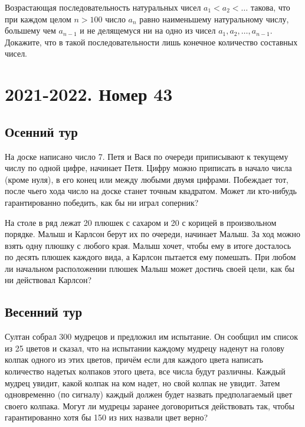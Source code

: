 \documentclass[11pt, a4paper]{common/document_template}
\begin{document}
\begin{exercise}
Возрастающая последовательность натуральных чисел $a_{1} < a_{2} < \dots$ такова, что при каждом целом $n > 100$ число $a_{n}$ равно
наименьшему натуральному числу, большему чем $a_{n-1}$ и не делящемуся ни на одно из чисел $a_{1}, a_{2}, \dots, a_{n-1}$. Докажите, что в такой последовательности лишь конечное количество составных чисел.
\end{exercise}

\chapter{2021-2022. Номер 43}

\section{Осенний тур}

\begin{exercise}
На доске написано число 7. Петя и Вася по очереди приписывают к текущему числу по одной цифре, начинает Петя. Цифру можно приписать в начало числа (кроме нуля), в его конец или между любыми двумя цифрами. Побеждает тот, после чьего хода число на доске станет точным квадратом. Может ли кто-нибудь гарантированно победить, как бы ни играл соперник?
\end{exercise}

\begin{exercise}
На столе в ряд лежат 20 плюшек с сахаром и 20 с корицей в произвольном порядке. Малыш и Карлсон берут их по очереди, начинает Малыш. За ход можно взять одну плюшку с любого края. Малыш хочет, чтобы ему в итоге досталось по десять плюшек каждого вида, а Карлсон пытается ему помешать. При любом ли начальном расположении плюшек Малыш может достичь своей цели, как бы ни действовал Карлсон?
\end{exercise}

\section{Весенний тур}

\begin{exercise}
Султан собрал 300 мудрецов и предложил им испытание. Он сообщил им список из 25
цветов и сказал, что на испытании каждому мудрецу наденут на голову колпак одного
из этих цветов, причём если для каждого цвета написать количество надетых колпаков этого цвета, все числа будут различны. Каждый мудрец увидит, какой колпак на ком надет, но свой колпак не увидит. Затем одновременно (по сигналу) каждый должен будет назвать предполагаемый цвет своего колпака. Могут ли мудрецы заранее договориться действовать так, чтобы гарантированно хотя бы 150 из них назвали цвет верно?
\end{exercise}
\end{document}
